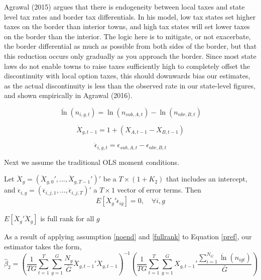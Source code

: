 Agrawal (2015) argues that there is endogeneity between local taxes and state level tax rates and border tax differentials. In his model, low tax states set higher taxes on the border than interior towns, and high tax states will set lower taxes on the border than the interior. The logic here is to mitigate, or not exacerbate, the border differential as much as possible from both sides of the border, but that this reduction occurs only gradually as you approach the border. Since most state laws do not enable towns to raise taxes sufficiently high to completely offset the discontinuity with local option taxes, this should downwards bias our estimates, as the actual discontinuity is less than the observed rate in our state-level figures, and shown empirically in Agrawal (2016).

\begin{equation}
\ddot \ln(n_{i,g,t}) = \ln(n_{sub,A,t})-\ln(n_{nbr,B,t})
\end{equation}

\begin{equation}
\ddot X_{g,t-1} = 1+(X_{A,t-1}-X_{B,t-1})
\end{equation}

\begin{equation}
\ddot \epsilon_{i,g,t} = \epsilon_{sub,A,t}-\epsilon_{nbr,B,t}
\end{equation}

Next we assume the traditional OLS moment conditions.

\begin{assumption}\label{noend}
Let  $\ddot X_{g} = (\ddot X_{g,0}', ... ,\ddot X_{g,T-1}')'$ be a $T \times (1+K_{2})$ that includes an intercept, and $\ddot \epsilon_{i,g} = (\ddot\epsilon_{i,j,1},...,\ddot\epsilon_{i,j,T})'$ a $T \times 1$ vector of error terms. Then 
\begin{equation}E[\ddot X_{g}'\ddot \epsilon_{ig}] = 0, \quad \forall i,g\end{equation}
\end{assumption}

\begin{assumption}\label{fullrank}
$E[\ddot X_{g}'\ddot X_{g}]$ is full rank for all $g$
\end{assumption}

As a result of applying assumption \ref{noend} and \ref{fullrank} to Equation \ref{pref}, our estimator takes the form,
\begin{equation}\label{pols_2s}
\hat \beta_{2} = \left(\frac{1}{TG} \sum_{t=1}^{T}\sum_{g=1}^{G}\frac{N_{g}}{\bar G}\ddot X_{g,t-1}'\ddot X_{g,t-1}\right)^{-1}\left(\frac{1}{TG}\sum_{t=1}^{T}\sum_{g=1}^{G}X_{g,t-1}'\frac{\sum_{i=1}^{N_{G}}\ddot \ln(n_{igt})}{\bar G}\right)
\end{equation}

